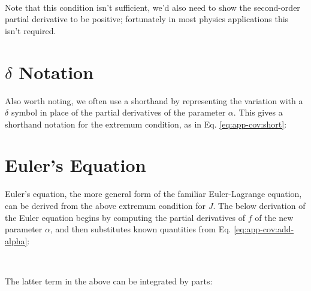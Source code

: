 \

Note that this condition isn't sufficient, we'd also need to show the second-order partial derivative to be positive; fortunately in most physics applications this isn't required. %

\section{$\delta$ Notation}
Also worth noting, we often use a shorthand by representing the variation with a $\delta$ symbol in place of the partial derivatives of the parameter $\alpha$. This gives a shorthand notation for the extremum condition, as in Eq. \ref{eq:app-cov:short}:

\section{Euler's Equation}
Euler's equation, the more general form of the familiar Euler-Lagrange equation, can be derived from the above extremum condition for $J$. The below derivation of the Euler equation begins by computing the partial derivatives of $f$ of the new parameter $\alpha$, and then substitutes known quantities from Eq. \ref{eq:app-cov:add-alpha}:


\

The latter term in the above can be integrated by parts:


